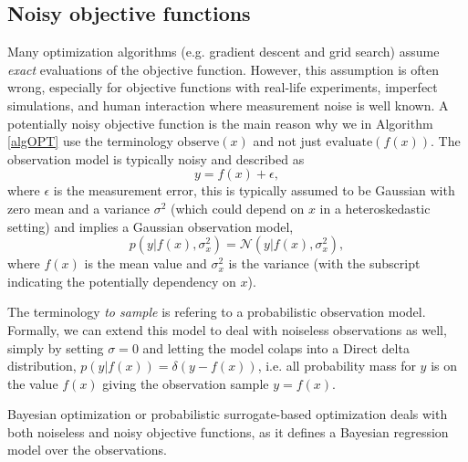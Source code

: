\subsection{Noisy objective functions}
Many optimization algorithms (e.g. gradient descent and grid search) assume \textit{exact}
evaluations of the objective function. However, this assumption is often wrong, especially for
objective functions with real-life experiments, imperfect simulations, and human interaction where
measurement noise is well known. A potentially noisy objective function is the main reason why we in
Algorithm \eqref{algOPT} use the terminology $\text{observe}(x)$ and not just
$\text{evaluate}(f(x))$. The observation model is typically noisy and described as
$$y = f(x)+\epsilon,$$ where $\epsilon$ is the measurement error, this is
typically assumed to be Gaussian with zero mean and a variance
$\sigma^2$ (which could depend on $x$ in a heteroskedastic setting) and implies a Gaussian observation model, 
$$p(y|f(x),\sigma_x^2) = \mathcal{N}(y|f(x),\sigma_x^2),$$ where $f(x)$ is the mean value and
$\sigma_x^2$ is the variance (with the subscript indicating the potentially dependency on $x$). 
\begin{note2}
    The terminology \textit{to sample} is refering to a probabilistic observation model. Formally, we
    can extend this model to deal with noiseless observations as well, simply by setting
    $\sigma = 0$ and letting the model colaps into a Direct delta distribution, $p(y|f(x)) =
    \mathcal{\delta}(y-f(x))$, i.e. all probability mass for $y$ is on the value $f(x)$ giving the
    observation sample $y = f(x)$. 
\end{note2}


Bayesian optimization or probabilistic surrogate-based optimization deals with both noiseless and noisy objective functions,
as it defines a Bayesian regression model over the observations.

